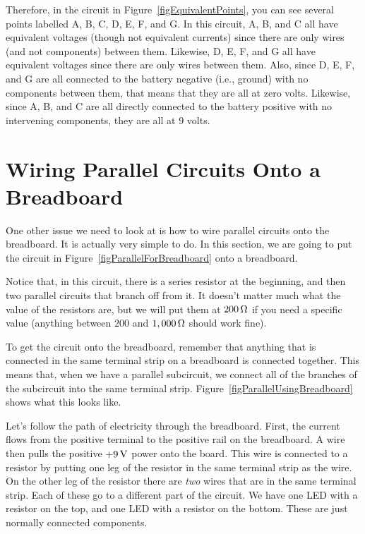 Therefore, in the circuit in Figure~\ref{figEquivalentPoints}, you can see several points labelled A, B, C, D, E, F, and G.
In this circuit, A, B, and C all have equivalent voltages (though not equivalent currents) since there are only wires (and not components) between them.
Likewise, D, E, F, and G all have equivalent voltages since there are only wires between them.  
Also, since D, E, F, and G are all connected to the battery negative (i.e., ground) with no components between them, that means that they are all at zero volts.
Likewise, since A, B, and C are all directly connected to the battery positive with no intervening components, they are all at 9 volts.


\section{Wiring Parallel Circuits Onto a Breadboard}

One other issue we need to look at is how to wire parallel circuits onto the breadboard.
It is actually very simple to do.
In this section, we are going to put the circuit in Figure~\ref{figParallelForBreadboard} onto a breadboard.


Notice that, in this circuit, there is a series resistor at the beginning, and then two parallel circuits that branch off from it.
It doesn't matter much what the value of the resistors are, but we will put them at $200\,\si{\ohm}$ if you need a specific value (anything between $200$ and $1,000\,\si{\ohm}$ should work fine).

To get the circuit onto the breadboard, remember that anything that is connected in the same terminal strip on a breadboard is connected together.
This means that, when we have a parallel subcircuit, we connect all of the branches of the subcircuit into the same terminal strip.
Figure~\ref{figParallelUsingBreadboard} shows what this looks like.


Let's follow the path of electricity through the breadboard.
First, the current flows from the positive terminal to the positive rail on the breadboard.
A wire then pulls the positive $+9\,\si{\volt}$ power onto the board.
This wire is connected to a resistor by putting one leg of the resistor in the same terminal strip as the wire.
On the other leg of the resistor there are \emph{two} wires that are in the same terminal strip.
Each of these go to a different part of the circuit.
We have one LED with a resistor on the top, and one LED with a resistor on the bottom.
These are just normally connected components.

